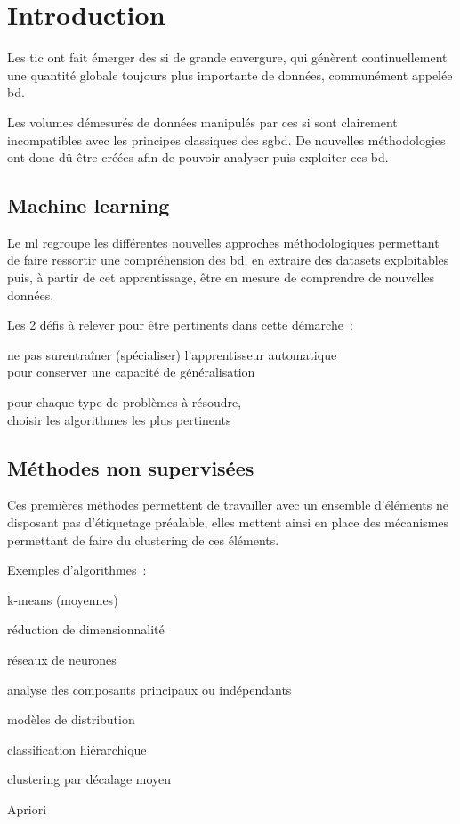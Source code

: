 \section{Introduction}

Les \gls{tic} ont fait émerger des \gls{si} de grande envergure, qui génèrent
continuellement une quantité globale toujours plus importante de données,
communément appelée \gls{bd}.

Les volumes démesurés de données manipulés par ces \gls{si} sont clairement
incompatibles avec les principes classiques des \gls{sgbd}.
De nouvelles méthodologies ont donc dû être créées afin de pouvoir
analyser puis exploiter ces \gls{bd}.

\subsection{Machine learning}

Le \gls{ml} regroupe les différentes nouvelles approches méthodologiques
permettant de faire ressortir une compréhension des \gls{bd}, en extraire
des \glspl{dataset} exploitables puis, à partir de cet apprentissage,
être en mesure de comprendre de nouvelles données.

Les 2 défis à relever pour être pertinents dans cette démarche :
\begin{itmz}
\item{ne pas surentraîner (spécialiser) l’apprentisseur automatique\\
pour conserver une capacité de généralisation}
\item{pour chaque type de problèmes à résoudre,\\
choisir les algorithmes les plus pertinents}
\end{itmz}

\subsection{Méthodes non supervisées}

Ces premières méthodes permettent de travailler avec un ensemble d’éléments
ne disposant pas d’étiquetage préalable, elles mettent ainsi en place
des mécanismes permettant de faire du \gls{clustering} de ces éléments.

Exemples d’algorithmes :
\begin{itmz}
\item{k-means (moyennes)}
\item{réduction de dimensionnalité}
\item{réseaux de neurones}
\item{analyse des composants principaux ou indépendants}
\item{modèles de distribution}
\item{classification hiérarchique}
\item{\gls{clustering} par décalage moyen}
\item{Apriori}
\end{itmz}


